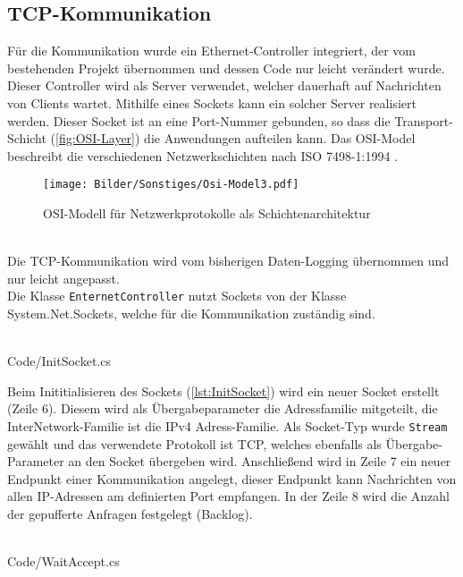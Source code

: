 \subsection{TCP-Kommunikation}
Für die Kommunikation wurde ein \glqq Ethernet-Controller\grqq{} integriert, der vom bestehenden Projekt übernommen und dessen Code nur leicht verändert wurde. Dieser Controller wird als Server verwendet, welcher dauerhaft auf Nachrichten von Clients wartet. Mithilfe eines Sockets kann ein solcher Server realisiert werden. Dieser Socket ist an eine Port-Nummer gebunden, so dass die Transport-Schicht (\autoref{fig:OSI-Layer}) die Anwendungen aufteilen kann. Das OSI-Model beschreibt die verschiedenen Netzwerkschichten nach ISO 7498-1:1994 \cite{iso_osi}. 
\begin{figure}
\centering
 \texttt{[image: Bilder/Sonstiges/Osi-Model3.pdf]}
 \caption[OSI-Modell für Netzwerkprotokolle]{OSI-Modell für Netzwerkprotokolle als Schichtenarchitektur \cite{osi-bild}}
 \label{fig:OSI-Layer}
\end{figure}
\ \\
Die TCP-Kommunikation wird vom bisherigen Daten-Logging übernommen und nur leicht angepasst.
\ \\
Die Klasse \texttt{EnternetController} nutzt Sockets von der Klasse \glqq System.Net.Sockets\grqq{}, welche für die Kommunikation zuständig sind.
\ \\
\begin{minipage}{\textwidth}
\ \\
 {Code/InitSocket.cs}
\ \\
\end{minipage}
Beim Inititialisieren des Sockets (\autoref{lst:InitSocket}) wird ein neuer Socket erstellt (Zeile 6). Diesem wird als Übergabeparameter die Adressfamilie mitgeteilt, die InterNetwork-Familie ist die IPv4 Adress-Familie. Als Socket-Typ wurde \texttt{Stream} gewählt und das verwendete Protokoll ist TCP, welches ebenfalls als Übergabe-Parameter an den Socket übergeben wird. Anschließend wird in Zeile 7 ein neuer Endpunkt einer Kommunikation angelegt, dieser Endpunkt kann Nachrichten von allen IP-Adressen am definierten Port empfangen. In der Zeile 8 wird die Anzahl der gepufferte Anfragen festgelegt (Backlog).
\ \\
\begin{minipage}{\textwidth}
\ \\
 {Code/WaitAccept.cs}
\ \\
\end{minipage}
